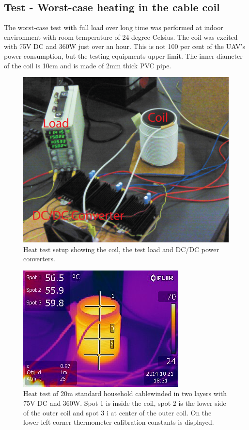 \subsection{Test - Worst-case heating in the cable coil}
The worst-case test with full load over long time was performed at indoor environment with room temperature of 24 degree Celsius. The coil was excited with 75V DC and 360W just over an hour. This is not 100 per cent of the UAV's power consumption, but the testing equipments upper limit. The inner diameter of the coil is 10cm and is made of 2mm thick PVC pipe.


\begin{figure}[H]
   \centering
   \includegraphics[scale=0.5]{graphics/heat_test/heat_test_setup.png}
   \caption{Heat test setup showing the coil, the test load and DC/DC power converters.}
   \end{figure}
      

\begin{figure}[H]
\centering
\includegraphics[scale=1]{graphics/heat_test/IR_1491.jpg}
\caption[Heat test, image from thermal camera]{Heat test of 20m standard household cable\footnotemark winded in two layers with 75V DC and 360W. Spot 1 is inside the coil, spot 2 is the lower side of the outer coil and spot 3 i at center of the outer coil. On the lower left corner thermometer calibration constants is displayed.}
\label{fig:heat_test_ir}
\end{figure}

